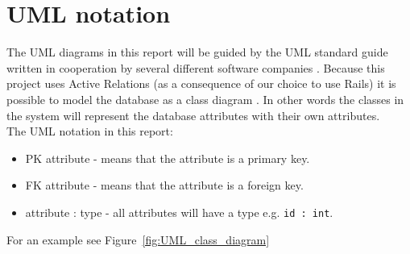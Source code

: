 \section{UML notation} \label{section:uml_notation}

The UML diagrams in this report will be guided by the UML standard guide written in cooperation by several different software companies \citep{UML_notation}.
Because this project uses Active Relations (as a consequence of our choice to use Rails) it is possible to model the database as a class diagram \citep{active_records}. 
In other words the classes in the system will represent the database attributes with their own attributes. \\

The UML notation in this report:
\begin{itemize}
	\item PK attribute - means that the attribute is a primary key.
	\item FK attribute - means that the attribute is a foreign key.
	\item attribute : type - all attributes will have a type e.g. \verb+id : int+.
\end{itemize}

For an example see Figure~\ref{fig:UML_class_diagram}